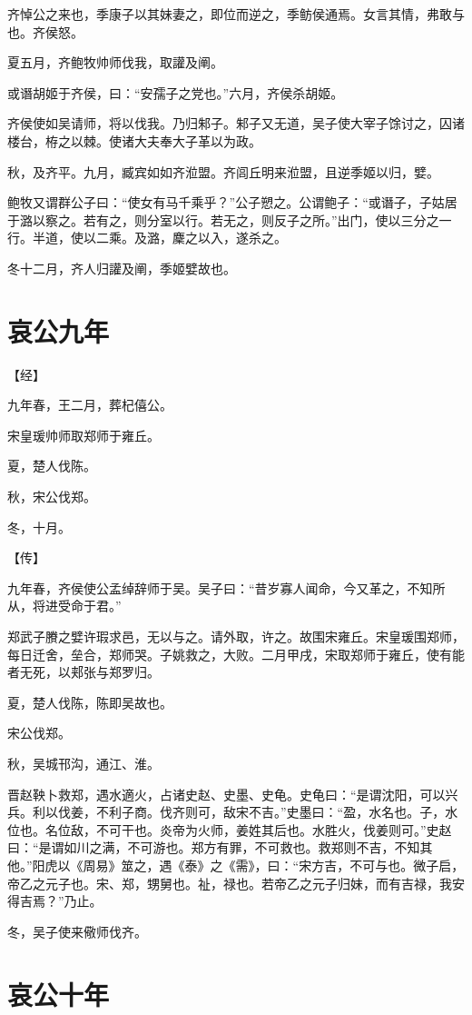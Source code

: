\documentclass[a4paper,12pt,UTF8,twoside]{ctexbook}
\begin{document}
齐悼公之来也，季康子以其妹妻之，即位而逆之，季鲂侯通焉。女言其情，弗敢与也。齐侯怒。

夏五月，齐鲍牧帅师伐我，取讙及阐。

或谮胡姬于齐侯，曰：“安孺子之党也。”六月，齐侯杀胡姬。

齐侯使如吴请师，将以伐我。乃归邾子。邾子又无道，吴子使大宰子馀讨之，囚诸楼台，栫之以棘。使诸大夫奉大子革以为政。

秋，及齐平。九月，臧宾如如齐涖盟。齐闾丘明来涖盟，且逆季姬以归，嬖。

鲍牧又谓群公子曰：“使女有马千乘乎？”公子愬之。公谓鲍子：“或谮子，子姑居于潞以察之。若有之，则分室以行。若无之，则反子之所。”出门，使以三分之一行。半道，使以二乘。及潞，麇之以入，遂杀之。

冬十二月，齐人归讙及阐，季姬嬖故也。


\section{哀公九年}


【经】

九年春，王二月，葬杞僖公。

宋皇瑗帅师取郑师于雍丘。

夏，楚人伐陈。

秋，宋公伐郑。

冬，十月。

【传】

九年春，齐侯使公孟绰辞师于吴。吴子曰：“昔岁寡人闻命，今又革之，不知所从，将进受命于君。”

郑武子賸之嬖许瑕求邑，无以与之。请外取，许之。故围宋雍丘。宋皇瑗围郑师，每日迁舍，垒合，郑师哭。子姚救之，大败。二月甲戌，宋取郑师于雍丘，使有能者无死，以郏张与郑罗归。

夏，楚人伐陈，陈即吴故也。

宋公伐郑。

秋，吴城邗沟，通江、淮。

晋赵鞅卜救郑，遇水適火，占诸史赵、史墨、史龟。史龟曰：“是谓沈阳，可以兴兵。利以伐姜，不利子商。伐齐则可，敌宋不吉。”史墨曰：“盈，水名也。子，水位也。名位敌，不可干也。炎帝为火师，姜姓其后也。水胜火，伐姜则可。”史赵曰：“是谓如川之满，不可游也。郑方有罪，不可救也。救郑则不吉，不知其他。”阳虎以《周易》筮之，遇《泰》之《需》，曰：“宋方吉，不可与也。微子启，帝乙之元子也。宋、郑，甥舅也。祉，禄也。若帝乙之元子归妹，而有吉禄，我安得吉焉？”乃止。

冬，吴子使来儆师伐齐。


\section{哀公十年}
\end{document}
